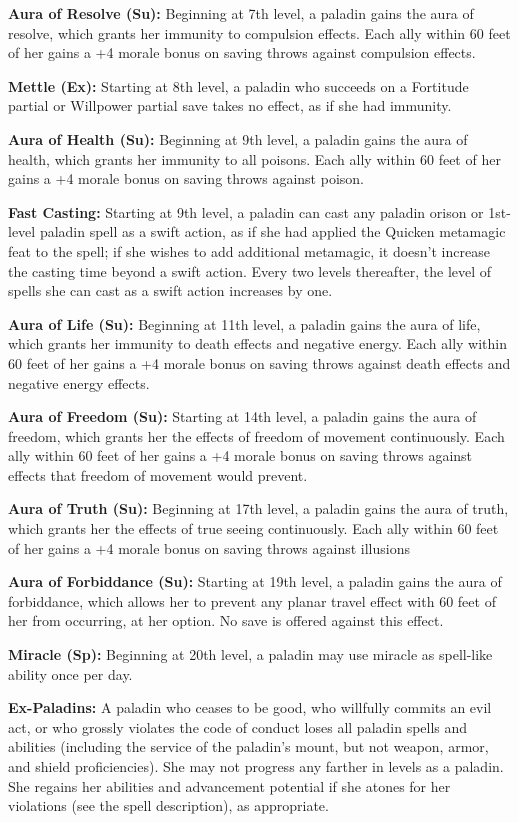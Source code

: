 \textbf{Aura of Resolve (Su):} Beginning at 7th level, a paladin gains the aura of resolve, which grants her immunity to compulsion effects. Each ally within 60 feet of her gains a +4 morale bonus on saving throws against compulsion effects.

\textbf{Mettle (Ex):} Starting at 8th level, a paladin who succeeds on a Fortitude partial or Willpower partial save takes no effect, as if she had immunity.

\textbf{Aura of Health (Su):} Beginning at 9th level, a paladin gains the aura of health, which grants her immunity to all poisons. Each ally within 60 feet of her gains a +4 morale bonus on saving throws against poison.

\textbf{Fast Casting:} Starting at 9th level, a paladin can cast any paladin orison or 1st-level paladin spell as a swift action, as if she had applied the Quicken metamagic feat to the spell; if she wishes to add additional metamagic, it doesn't increase the casting time beyond a swift action. Every two levels thereafter, the level of spells she can cast as a swift action increases by one.

\textbf{Aura of Life (Su):} Beginning at 11th level, a paladin gains the aura of life, which grants her immunity to death effects and negative energy. Each ally within 60 feet of her gains a +4 morale bonus on saving throws against death effects and negative energy effects.

\textbf{Aura of Freedom (Su):} Starting at 14th level, a paladin gains the aura of freedom, which grants her the effects of freedom of movement continuously. Each ally within 60 feet of her gains a +4 morale bonus on saving throws against effects that freedom of movement would prevent.

\textbf{Aura of Truth (Su):} Beginning at 17th level, a paladin gains the aura of truth, which grants her the effects of true seeing continuously. Each ally within 60 feet of her gains a +4 morale bonus on saving throws against illusions

\textbf{Aura of Forbiddance (Su):}  Starting at 19th level, a paladin gains the aura of forbiddance, which allows her to prevent any planar travel effect with 60 feet of her from occurring, at her option. No save is offered against this effect.

\textbf{Miracle (Sp):} Beginning at 20th level, a paladin may use miracle as spell-like ability once per day.

\textbf{Ex-Paladins:} A paladin who ceases to be good, who willfully commits an evil act, or who grossly violates the code of conduct loses all paladin spells and abilities (including the service of the paladin's mount, but not weapon, armor, and shield proficiencies). She may not progress any farther in levels as a paladin. She regains her abilities and advancement potential if she atones for her violations (see the  spell description), as appropriate.